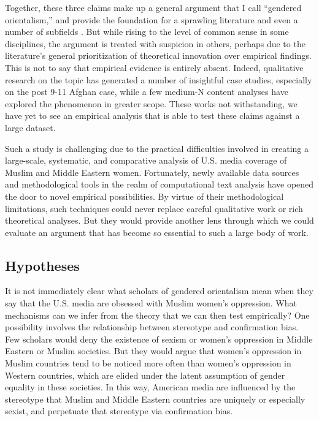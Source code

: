 \documentclass[11pt, oneside]{article}
\begin{document}
Together, these three claims make up a general argument that I call ``gendered orientalism,'' and provide the foundation for a sprawling literature and even a number of subfields \cite{abu-lughod_orientalism_2001,charrad2011gender}. But while rising to the level of common sense in some disciplines, the argument is treated with suspicion in others, perhaps due to the literature's general prioritization of theoretical innovation over empirical findings. This is not to say that empirical evidence is entirely absent. Indeed, qualitative research on the topic has generated a number of insightful case studies, especially on the post 9-11 Afghan case, while a few medium-N content analyses have explored the phenomenon in greater scope. These works not withstanding, we have yet to see an empirical analysis that is able to test these claims against a large dataset. 

Such a study is challenging due to the practical difficulties involved in creating a large-scale, systematic, and comparative analysis of U.S. media coverage of Muslim and Middle Eastern women. Fortunately, newly available data sources and methodological tools in the realm of computational text analysis have opened the door to novel empirical possibilities. By virtue of their methodological limitations, such techniques could never replace careful qualitative work or rich theoretical analyses. But they would provide another lens through which we could evaluate an argument that has become so essential to such a large body of work.

\subsection{Hypotheses}

It is not immediately clear what scholars of gendered orientalism mean when they say that the U.S. media are obsessed with Muslim women's oppression. What mechanisms can we infer from the theory that we can then test empirically? One possibility involves the relationship between stereotype and confirmation bias. Few scholars would deny the existence of sexism or women's oppression in Middle Eastern or Muslim societies. But they would argue that women's oppression in Muslim countries tend to be noticed more often than women's oppression in Western countries, which are elided under the latent assumption of gender equality in these societies. In this way, American media are influenced by the stereotype that Muslim and Middle Eastern countries are uniquely or especially sexist, and perpetuate that stereotype via confirmation bias. 
\end{document}
